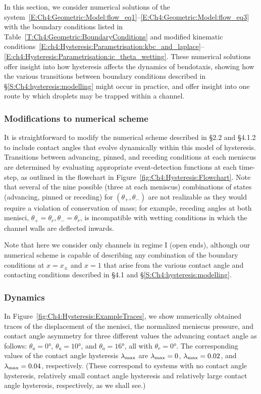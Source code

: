 In this section, we consider numerical solutions of the system~\eqref{E:Ch4:Geometric:Model:flow_eq1}--\eqref{E:Ch4:Geometric:Model:flow_eq3} with the boundary conditions listed in Table~\ref{T:Ch4:Geometric:BoundaryConditions} and modified kinematic conditions~\eqref{E:ch4:Hysteresis:Parametrisation:kbc_and_laplace}--\eqref{E:ch4:Hysteresis:Parametrisation:ic_theta_wetting}. These numerical solutions offer insight into how hysteresis affects the dynamics of bendotaxis, showing how the various transitions between boundary conditions described in \S\ref{S:Ch4:hysteresis:modelling} might occur in practice, and offer insight into one route by which droplets may be trapped within a channel.

\subsubsection{Modifications to numerical scheme}
It is straightforward to modify the numerical scheme described in \S2.2 and \S4.1.2 to include contact angles that evolve dynamically within this model of hysteresis. Transitions between advancing, pinned, and receding conditions at each meniscus are determined by evaluating appropriate event-detection functions at each time-step, as outlined in the flowchart in Figure~\ref{fig:Ch4:Hysteresis:Flowchart}. Note that several of the nine possible (three at each meniscus) combinations of states (advancing, pinned or receding) for $(\theta_+, \theta_-)$ are not realizable as they would require a violation of conservation of mass; for example, receding angles at both menisci, $\theta_+ = \theta_r, \theta_- = \theta_r$, is incompatible with wetting conditions in which the channel walls are deflected inwards.

Note that here we consider only channels in regime I (open ends), although our numerical scheme is capable of describing any combination of the boundary conditions at $x = x_{\pm}$ and $x = 1$ that arise from the various contact angle and contacting conditions described in \S4.1 and \S\ref{S:Ch4:hysteresis:modelling}.

\subsubsection{Dynamics}
In Figure~\ref{fig:Ch4:Hysteresis:ExampleTraces}, we show numerically obtained traces of the displacement of the menisci, the normalized meniscus pressure, and contact angle asymmetry for three different values the advancing contact angle as follows: $\theta_a = 0\si{\degree}$,  $\theta_a = 10\si{\degree}$, and $ \theta_a =16\si{\degree}$, all with $\theta_r = 0\si{\degree}$. The corresponding values of the contact angle hysteresis $\lambda_{\text{max}}$ are $\lambda_{\text{max}} = 0$, $\lambda_{\text{max}} = 0.02$, and $\lambda_{\text{max}} = 0.04$, respectively. (These correspond to systems with no contact angle hysteresis, relatively small contact angle hysteresis and relatively large contact angle hysteresis, respectively, as we shall see.)

